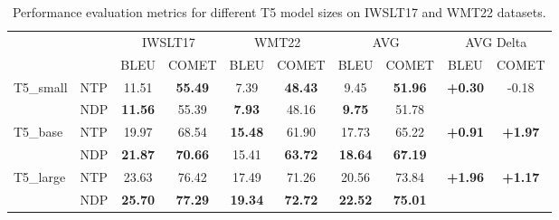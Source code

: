 \documentclass{article}
\begin{document}
\begin{table}[ht]
    \centering %
    \begin{tabular}{llcccccccc} %
        \toprule %
        & & \multicolumn{2}{c}{IWSLT17} & \multicolumn{2}{c}{WMT22} & \multicolumn{2}{c}{AVG} & \multicolumn{2}{c}{AVG Delta} \\
        \cmidrule(r){3-4} \cmidrule(r){5-6} \cmidrule(r){7-8} \cmidrule(r){9-10} %
        & & BLEU & COMET & BLEU & COMET & BLEU & COMET & BLEU & COMET \\
        \midrule %
        \multirow{2}{*}{T5\_small} 
        & NTP & 11.51 & \textbf{55.49}& 7.39 & \textbf{48.43}& 9.45 & \textbf{51.96} & \multirow{2}{*}{\textbf{+0.30}} & \multirow{2}{*}{-0.18} \\
        & NDP & \textbf{11.56}& 55.39 & \textbf{7.93}& 48.16 & \textbf{9.75} & 51.78 &  &  \\
        \midrule %
        \multirow{2}{*}{T5\_base} 
        & NTP & 19.97 & 68.54 & \textbf{15.48}& 61.90 & 17.73 & 65.22 & \multirow{2}{*}{\textbf{+0.91}} & \multirow{2}{*}{\textbf{+1.97}} \\
        & NDP & \textbf{21.87}& \textbf{70.66}& 15.41 & \textbf{63.72}& \textbf{18.64} & \textbf{67.19} &  &  \\
        \midrule %
        \multirow{2}{*}{T5\_large} 
        & NTP & 23.63 & 76.42 & 17.49 & 71.26 & 20.56 & 73.84 & \multirow{2}{*}{\textbf{+1.96}} & \multirow{2}{*}{\textbf{+1.17}} \\
        & NDP & \textbf{25.70}& \textbf{77.29}& \textbf{19.34}& \textbf{72.72}& \textbf{22.52} & \textbf{75.01} &  &  \\
        \bottomrule %
    \end{tabular}
    \caption{Performance evaluation metrics for different T5 model sizes on IWSLT17 and WMT22 datasets.} %
    \label{tab:performance} %
\end{table}
\end{document}
